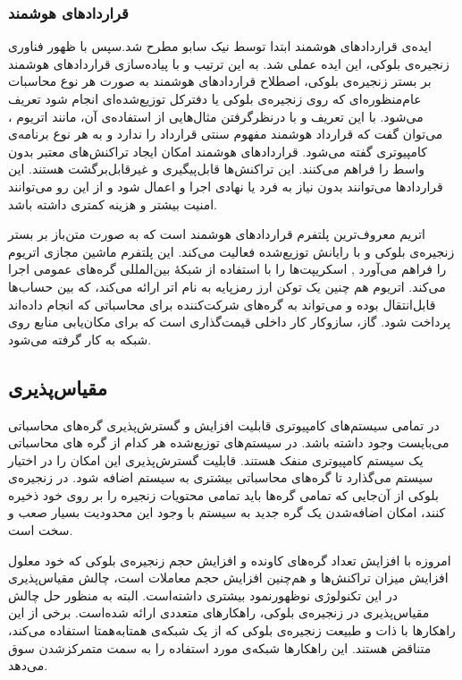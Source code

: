 \subsubsection{قراردادهای هوشمند}
ایده‌ی قراردادهای هوشمند ابتدا توسط نیک سابو
 مطرح شد.سپس با ظهور فناوری زنجیره‌ی بلوکی، این ایده عملی شد. به این ترتیب و با پیاده‌سازی قراردادهای هوشمند بر بستر زنجیره‌ی بلوکی، اصطلاح قراردادهای هوشمند به صورت هر نوع محاسبات عام‌منظوره‌ای که روی زنجیره‌ی بلوکی یا دفترکل توزیع‌شده‌ای انجام شود تعریف می‌شود. با این تعریف و با درنظرگرفتن مثال‌هایی از استفاده‌ی آن، مانند اتریوم
 ، می‌توان گفت که قرارداد هوشمند مفهوم سنتی قرارداد را ندارد و به هر نوع برنامه‌ی کامپیوتری گفته می‌شود. قراردادهای هوشمند امکان ایجاد تراکنش‌های معتبر بدون واسط را فراهم می‌کنند. این تراکنش‌ها قابل‌پیگیری و غیرقابل‌برگشت هستند. این قراردادها می‌توانند بدون نیاز به فرد یا نهادی اجرا و اعمال شود و از این رو می‌توانند امنیت بیشتر و هزینه کمتری داشته باشد.
 
 اتریم معروف‌ترین پلتفرم قراردادهای هوشمند است که به صورت متن‌باز بر بستر زنجیره‌ی بلوکی و با رایانش توزیع‌شده فعالیت می‌کند. این پلتفرم ماشین مجازی اتریوم 
 را فراهم می‌آورد , اسکریپت‌ها را با استفاده از شبکهٔ بین‌المللی گره‌های عمومی اجرا می‌کند. اتریوم هم چنین یک توکن ارز رمزپایه به نام اتر
  ارائه می‌کند، که بین حساب‌ها قابل‌انتقال بوده و می‌تواند به گره‌های شرکت‌کننده برای محاسباتی که انجام داده‌اند پرداخت شود. گاز، سازوکار کار داخلی قیمت‌گذاری است که برای مکان‌یابی منابع روی شبکه به کار گرفته می‌شود. 
 \cite{radziwill}

\subsection{مقیاس‌پذیری}
در تمامی سیستم‌های کامپیوتری قابلیت افزایش و گسترش‌پذیری گره‌های محاسباتی می‌بایست وجود داشته باشد. در سیستم‌های توزیع‌شده هر کدام از گره های محاسباتی یک سیستم کامپیوتری منفک هستند. قابلیت گسترش‌پذیری این امکان را در اختیار سیستم می‌گذارد تا گره‌های محاسباتی بیشتری به سیستم اضافه شود. در زنجیره‌ی بلوکی از آن‌جایی که تمامی گره‌ها باید تمامی محتویات زنجیره را بر روی خود ذخیره کنند، امکان اضافه‌شدن یک گره جدید به سیستم با وجود این محدودیت بسیار صعب و سخت است. 

امروزه با افزایش تعداد گره‌های کاونده و افزایش حجم زنجیره‌ی بلوکی که خود معلول افزایش میزان تراکنش‌ها و هم‌چنین افزایش حجم معاملات است، چالش مقیاس‌پذیری در این تکنولوژی نوظهورنمود بیشتری داشته‌است. البته به منظور حل چالش مقیاس‌پذیری در زنجیره‌ی بلوکی، راهکارهای متعددی ارائه شده‌است. برخی از این راهکارها با ذات و طبیعت زنجیره‌ی بلوکی که از یک شبکه‌ی همتابه‌همتا استفاده می‌کند، متناقض هستند. این راهکارها شبکه‌ی مورد استفاده را به سمت متمرکزشدن
سوق می‌دهد.

